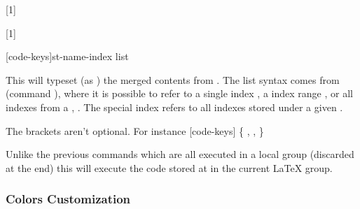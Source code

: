 \documentclass{article}
\begin{document}
[1]

[1]



\begin{codedescribe}[code,new=2025/04/29]{\tsmergedcode*}
	\begin{codesyntax}%
		\tsmacro{\tsmergedcode*}[code-keys]{st-name-index list}
	\end{codesyntax}
This will typeset (as \tsobj{\tscode}) the merged contents from . The list syntax comes from  (command \tsobj{\mergesc}), where it is possible to refer to a single index , a index range , or all indexes from a , . The special index  refers to all indexes stored under a given .
\end{codedescribe}
\begin{tsremark}
  The brackets aren't optional. For instance \tsmacro{\tsmergedcode*}[code-keys]{} {\color{red}\{}  ,  ,  {\color{red}\}}
\end{tsremark}
\begin{codedescribe}[code,new=2025/04/29]{\tsexec}
	\begin{codesyntax}%
		\tsargs[oarg]{index}
	\end{codesyntax}
Unlike the previous commands which are all executed in a local group (discarded at the end) this will execute the code stored at  in the current \LaTeX{} group.

\end{codedescribe}

\subsubsection{Colors Customization}
\end{document}
